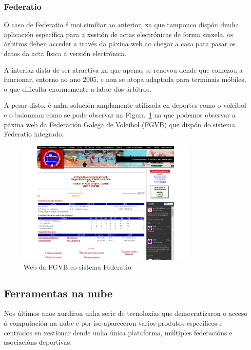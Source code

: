     \subsubsection{Federatio}

    O caso de Federatio é moi similiar ao anterior, xa que tampouco dispón 
dunha aplicación específica para a xestión de actas electrónicas de forma 
sinxela, os árbitros deben acceder a través da páxina web ao chegar 
a casa para pasar os datos da acta física á versión electrónica.

    A interfaz dista de ser atractiva xa que apenas se renovou dende que comezou a 
funcionar, entorno ao ano 2005, e non se atopa adaptada para terminais móbiles, 
o que dificulta enormemente a labor dos árbitros.

    A pesar disto, é unha solución amplamente utilizada en deportes como o 
voleibol e o balonman como se pode observar na Figura~\ref{fig:img:federatio} 
na que podemos observar a páxina web da Federación Galega de Voleibol (FGVB) 
que dispón do sistema Federatio integrado.

      \begin{figure}[h!]
	\begin{center}
	  \includegraphics[width=0.8\textwidth]{./img/federatio-app.png}
	  \caption{Web da FGVB co sistema Federatio}
	  \label{fig:img:federatio}
	\end{center}
      \end{figure}

\clearpage


  \subsection{Ferramentas na nube}

  Nos últimos anos xurdiron unha serie de tecnoloxías que democratizaron o 
acceso á computación na nube e por iso apareceron varios produtos específicos 
e centrados en xestionar dende unha única plataforma, múltiples federacións e 
asociacións deportivas.

